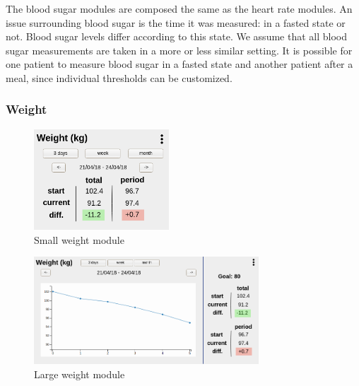         The blood sugar modules are composed the same as the heart rate modules. An issue surrounding blood sugar is the time it was measured: in a fasted state or not. Blood sugar levels differ according to this state. We assume that all blood sugar measurements are taken in a more or less similar setting. It is possible for one patient to measure blood sugar in a fasted state and another patient after a meal, since individual thresholds can be customized.

        \subsubsection{Weight}

        \begin{figure}[!htb]
            \centering
            \includegraphics[width=0.45\textwidth]{chapters/3_design/mockups/weight_small}
            \caption{Small weight module}\label{fig:weight_small}
        \end{figure}

        \begin{figure}[!htb]
            \centering
            \includegraphics[width=0.75\textwidth]{chapters/3_design/mockups/weight_large}
            \caption{Large weight module}\label{fig:weight_large}
        \end{figure}

